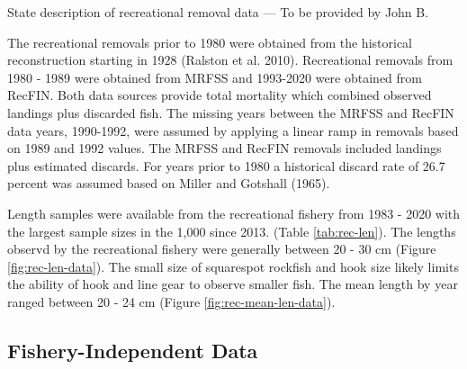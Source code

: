 \documentclass[11pt,
  english,
  a4paper,
]{article}
\begin{document}

State description of recreational removal data --- To be provided by John B.

\leavevmode\tagmcend\tagstructend\par


The recreational removals prior to 1980 were obtained from the historical reconstruction starting in 1928 {(Ralston et al. 2010)\leavevmode\tagmcend\tagstructend}. Recreational removals from 1980 - 1989 were obtained from MRFSS and 1993-2020 were obtained from RecFIN. Both data sources provide total mortality which combined observed landings plus discarded fish. The missing years between the MRFSS and RecFIN data years, 1990-1992, were assumed by applying a linear ramp in removals based on 1989 and 1992 values. The MRFSS and RecFIN removals included landings plus estimated discards. For years prior to 1980 a historical discard rate of 26.7 percent was assumed based on Miller and Gotshall {(1965)\leavevmode\tagmcend\tagstructend}.

\leavevmode\tagmcend\tagstructend\par


Length samples were available from the recreational fishery from 1983 - 2020 with the largest sample sizes in the 1,000 since 2013. (Table \ref{tab:rec-len}). The lengths observd by the recreational fishery were generally between 20 - 30 cm (Figure \ref{fig:rec-len-data}). The small size of squarespot rockfish and hook size likely limits the ability of hook and line gear to observe smaller fish. The mean length by year ranged between 20 - 24 cm (Figure \ref{fig:rec-mean-len-data}).

\leavevmode\tagmcend\tagstructend\par


\hypertarget{fishery-independent-data}{%
\subsection{Fishery-Independent Data}\label{fishery-independent-data}}

\leavevmode\tagmcend\tagstructend
\end{document}
